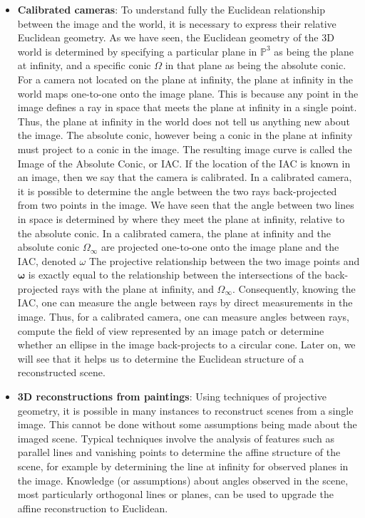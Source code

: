 \documentclass{report}
\begin{document}
\begin{itemize}
\begin{enumerate}[label=(\alph*)]
                \item all the space points are coplanar.
            \end{enumerate}
        \item \textbf{Calibrated cameras}: To understand fully the Euclidean relationship between the image and the world, it is necessary to express their relative Euclidean geometry. As we have seen, the Euclidean geometry of the 3D world is determined by specifying a particular plane in $\mathbb{P}^{3}$ as being the plane at infinity, and a specific conic $\Omega $ in that plane as being the absolute conic. For a camera not located on the plane at infinity, the plane at infinity in the world maps one-to-one onto the image plane. This is because any point in the image defines a ray in space that meets the plane at infinity in a single point. Thus, the plane at infinity in the world does not tell us anything new about the image.
            \bigbreak \noindent 
            The absolute conic, however being a conic in the plane at infinity must project to a conic in the image. The resulting image curve is called the Image of the Absolute Conic, or IAC. If the location of the IAC is known in an image, then we say that the camera is calibrated.
            \bigbreak \noindent 
            In a calibrated camera, it is possible to determine the angle between the two rays back-projected from two points in the image. We have seen that the angle between two lines in space is determined by where they meet the plane at infinity, relative to the absolute conic. In a calibrated camera, the plane at infinity and the absolute conic $\Omega_{\infty }$ are projected one-to-one onto the image plane and the IAC, denoted $\omega$
            \bigbreak \noindent 
            The projective relationship between the two image points and $\boldsymbol{\omega}$ is exactly equal to the relationship between the intersections of the back-projected rays with the plane at infinity, and $\Omega _{\infty }$. Consequently, knowing the IAC, one can measure the angle between rays by direct measurements in the image. Thus, for a calibrated camera, one can measure angles between rays, compute the field of view represented by an image patch or determine whether an ellipse in the image back-projects to a circular cone. Later on, we will see that it helps us to determine the Euclidean structure of a reconstructed scene.
        \item \textbf{3D reconstructions from paintings}: Using techniques of projective geometry, it is possible in many instances to reconstruct scenes from a single image. This cannot be done without some assumptions being made about the imaged scene. Typical techniques involve the analysis of features such as parallel lines and vanishing points to determine the affine structure of the scene, for example by determining the line at infinity for observed planes in the image. Knowledge (or assumptions) about angles observed in the scene, most particularly orthogonal lines or planes, can be used to upgrade the affine reconstruction to Euclidean.

\end{itemize}
\end{document}
